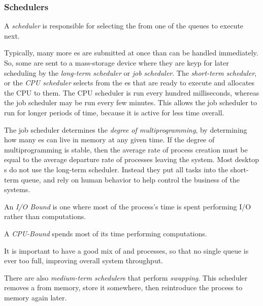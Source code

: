 \subsubsection{Schedulers}\label{subsubsec:Schedulers}
\begin{definition}[Scheduler]\label{def:Scheduler}
  A \emph{scheduler} is responsible for selecting the  from one of the queues to execute next.
\end{definition}

Typically, many more es are submitted at once than can be handled immediately.
So, some are sent to a mass-storage device where they are keyp for later scheduling by the \emph{long-term scheduler} or \emph{job scheduler}.
The \emph{short-term scheduler}, or the \emph{CPU scheduler} selects from the es that are ready to execute and allocates the CPU to them.
The CPU scheduler is run every hundred milliseconds, whereas the job scheduler may be run every few minutes.
This allows the job scheduler to run for longer periods of time, because it is active for less time overall.

The job scheduler determines the \emph{degree of multiprogramming}, by determining how many es can live in memory at any given time.
If the degree of multiprogramming is stable, then the average rate of process creation must be equal to the average departure rate of processes leaving the system.
Most desktop s do not use the long-term scheduler.
Instead they put all tasks into the short-term queue, and rely on human behavior to help control the business of the systems.

\begin{definition}[I/O Bound]\label{def:IO_Bound}
  An \emph{I/O Bound}  is one where most of the process's time is spent performing I/O rather than computations.
\end{definition}

\begin{definition}\label{def:CPU_Bound}
  A \emph{CPU-Bound}  spends most of its time performing computations.
\end{definition}

It is important to have a good mix of  and  processes, so that no single queue is ever too full, improving overall system throughput.

There are also \emph{medium-term scheduler}s that perform \emph{swapping}.
This scheduler removes a  from memory, store it somewhere, then reintroduce the process to memory again later.

